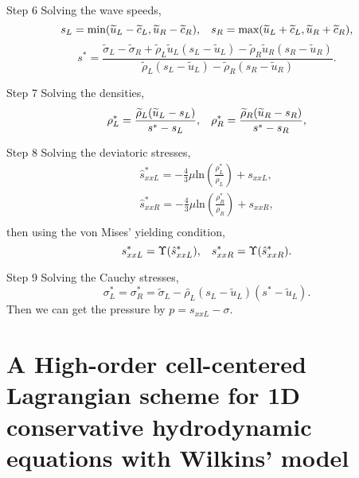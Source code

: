 \documentclass{article}
\theoremstyle{plain}\newtheorem{definition}{\sc{Definition}}
\theoremstyle{defination}\newtheorem{example}{Example}[section]
\numberwithin{equation}{section}
\numberwithin{table}{section}
\begin{document}
Step 6  Solving the wave speeds,
\begin{equation*}
  s_L = \text{min} (\widetilde{u}_L-\widetilde{c}_L, \widetilde{u}_R-\widetilde{c}_R), \hspace{0.3cm} s_R = \text{max}(\widetilde{u}_L+\widetilde{c}_L, \widetilde{u}_R+\widetilde{c}_R),
	\end{equation*}
	\begin{equation*}
	  s^* = \frac{\widetilde{\sigma}_L-\widetilde{\sigma}_R+\widetilde{\rho}_L \widetilde{u}_L(s_L-\widetilde{u}_L)-\widetilde{\rho}_R \widetilde{u}_R(s_R-\widetilde{u}_R)}{\widetilde{\rho}_L(s_L-\widetilde{u}_L)-\widetilde{\rho}_R(s_R-\widetilde{u}_R)}.
\end{equation*}

Step 7  Solving the densities,
\begin{equation*}
  \rho_L^* = \frac{\widetilde{\rho}_L(\widetilde{u}_L-s_L)}{s^*-s_L}, \hspace{0.3cm}  \rho_R^* = \frac{\widetilde{\rho}_R(\widetilde{u}_R-s_R)}{s^*-s_R},
\end{equation*}

Step 8 Solving the deviatoric stresses,
 \begin{align*}
  \hat{s}_{xxL}^* =  -\frac{4}{3}\mu \text{ln}\left( \frac{\rho_L^*}{\rho_L}  \right)+s_{xxL},\\
  \hat{s}_{xxR}^* =  -\frac{4}{3}\mu \text{ln}\left( \frac{\rho_R^*}{\rho_R}  \right)+s_{xxR},\\
\end{align*}
then using  the von Mises' yielding condition,
\begin{equation*}
  s_{xxL}^* = \Upsilon(\hat{s}_{xxL}^*) , \hspace{0.3cm}  s_{xxR}^* = \Upsilon(\hat{s}_{xxR}^*).
\end{equation*}

Step 9  Solving the Cauchy stresses,
\begin{equation*}
  \sigma_L^*=\sigma_R^*=\widetilde{\sigma}_L -\widetilde{\rho_L} (s_L-\widetilde{u}_L)(s^*-\widetilde{u}_L).
\end{equation*}
 Then we can get the pressure by $p =s_{xxL}-\sigma$.

 \section{ A High-order cell-centered Lagrangian scheme for 1D  conservative hydrodynamic equations with Wilkins' model}
 
\end{document}
